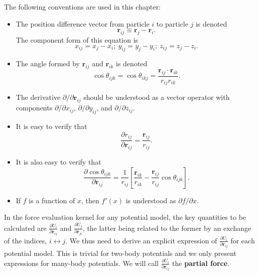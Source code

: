 \documentclass[12pt,a4paper]{report}
\newcommand{\vect}[1]{\boldsymbol{#1}}
\begin{document}
The following conventions are used in this chapter:
\begin{itemize}
\item The position difference vector from particle $i$ to particle $j$ is denoted
\begin{equation}
 \boxed{ \vect{r}_{ij} \equiv \vect{r}_j - \vect{r}_i } .
\end{equation}
The component form of this equation is
\begin{equation}
x_{ij} = x_j - x_i; ~y_{ij} = y_j - y_i; ~z_{ij} = z_j - z_i.
\end{equation}
\item The angle formed by $\vect{r}_{ij}$ and $\vect{r}_{ik}$ is denoted
\begin{equation}
\label{equation:cos_theta}
\boxed{\cos\theta_{ijk} = \cos\theta_{ikj} = \frac{\vect{r}_{ij} \cdot \vect{r}_{ik}}{r_{ij} r_{ik}}}.
\end{equation}
\item The derivative $\partial/\partial \vect{r}_{ij}$ should be understood as a vector operator with
components $\partial/\partial x_{ij}$, $\partial/\partial y_{ij}$, and $\partial/\partial z_{ij}$.
\item It is easy to verify that
\begin{equation}
\boxed{
\frac{\partial r_{ij}}{\partial \vect{r}_{ij}} = \frac{\vect{r}_{ij}}{r_{ij}}
}.
\end{equation}
\item It is also easy to verify that
\begin{equation}
\boxed{
\frac{\partial \cos\theta_{ijk}}{\partial \vect{r}_{ij}}
= \frac{1}{r_{ij}}\left[\frac{\vect{r}_{ik}}{r_{ik}}
- \frac{\vect{r}_{ij}}{r_{ij}} \cos\theta_{ijk}\right]
}.
\end{equation}
\item
If $f$ is a function of $x$, then $f'(x)$ is understood as $\partial f / \partial x$.
\end{itemize}

In the force evaluation kernel for any potential model, the key quantities to be calculated are $\frac{\partial U_{i}}{\partial \vect{r}_{ij}}$  and $\frac{\partial U_{j}}{\partial \vect{r}_{ji}}$, the latter being related to the former by an exchange of the indices, $i\leftrightarrow j$. We thus need to derive an explicit expression of $\frac{\partial U_{i}}{\partial \vect{r}_{ij}}$ for each potential model. This is trivial for two-body potentials and we only present expressions for many-body potentials. We will call $\frac{\partial U_{i}}{\partial \vect{r}_{ij}}$ the \textbf{partial force}.
\end{document}
